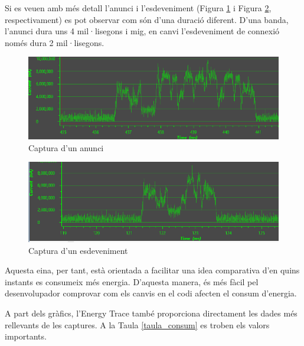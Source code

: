 Si es veuen amb més detall l'anunci i l'esdeveniment (Figura \ref{energy_trace_adv} i Figura \ref{energy_trace_event}, respectivament) es pot observar com són d'una duració diferent.
D'una banda, l'anunci dura uns 4 mil·lisegons i mig, en canvi l'esdeveniment de connexió només dura 2 mil·lisegons.
\newline
\begin{figure}[!h]
	\begin{center}
		\includegraphics[width=\textwidth]{./images/pic_anunci_captura.png}
		\caption{Captura d'un anunci}
		\label{energy_trace_adv}
	\end{center}
\end{figure}
\begin{figure}[!h]
	\begin{center}
		\includegraphics[width=\textwidth]{./images/pic_connectat_captura.png}
		\caption{Captura d'un esdeveniment}
		\label{energy_trace_event}
	\end{center}
\end{figure}

Aquesta eina, per tant, està orientada a facilitar una idea comparativa d'en quins instants es consumeix més energia.
D'aquesta manera, és més fàcil pel desenvolupador comprovar com els canvis en el codi afecten el consum d'energia.

A part dels gràfics, l'Energy Trace també proporciona directament les dades més rellevants de les captures.
A la Taula \ref{taula_consum} es troben els valors importants.\newline

